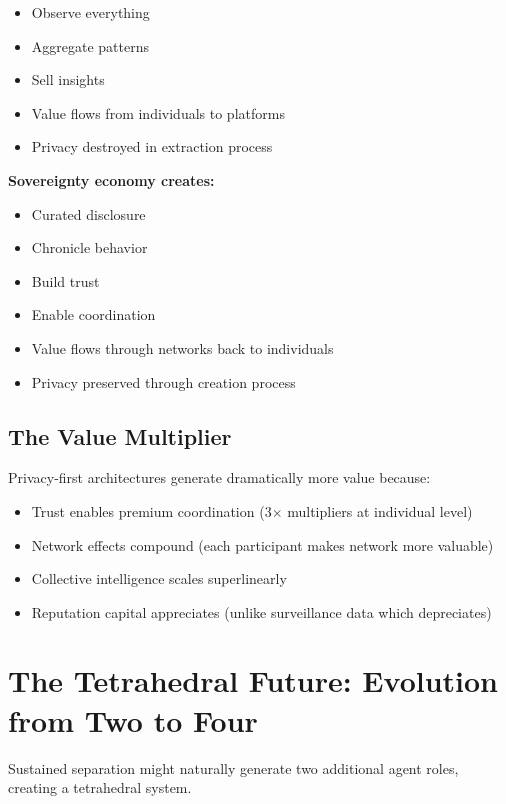 \documentclass[11pt,a4paper]{article}
\theoremstyle{definition}
\begin{document}
\begin{itemize}
    \item Observe everything
    \item Aggregate patterns
    \item Sell insights
    \item Value flows from individuals to platforms
    \item Privacy destroyed in extraction process
\end{itemize}

\textbf{Sovereignty economy creates:}

\begin{itemize}
    \item Curated disclosure
    \item Chronicle behavior
    \item Build trust
    \item Enable coordination
    \item Value flows through networks back to individuals
    \item Privacy preserved through creation process
\end{itemize}

\subsection{The Value Multiplier}

Privacy-first architectures generate dramatically more value because:

\begin{itemize}
    \item Trust enables premium coordination (3$\times$ multipliers at individual level)
    \item Network effects compound (each participant makes network more valuable)
    \item Collective intelligence scales superlinearly
    \item Reputation capital appreciates (unlike surveillance data which depreciates)
\end{itemize}

\section{The Tetrahedral Future: Evolution from Two to Four}

Sustained separation might naturally generate two additional agent roles, creating a tetrahedral system.
\end{document}
